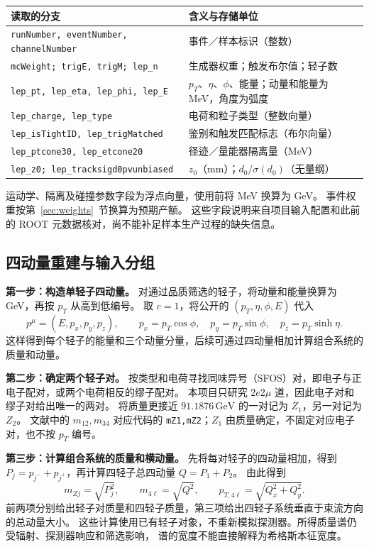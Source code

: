 \documentclass[11pt,a4paper,fontset=fandol,scheme=plain]{ctexart}
\newcommand{\gev}{\,\mathrm{GeV}}
\begin{document}
\begingroup
\small
\renewcommand{\arraystretch}{1.13}
\begin{tabularx}{\linewidth}{@{}p{.62\linewidth}Y@{}}
\toprule
读取的分支 & 含义与存储单位 \\
\midrule
\texttt{runNumber, eventNumber, channelNumber} & 事件／样本标识（整数） \\
\texttt{mcWeight; trigE, trigM; lep\_n} & 生成器权重；触发布尔值；轻子数 \\
\texttt{lep\_pt, lep\_eta, lep\_phi, lep\_E} & $p_T$、$\eta$、$\phi$、能量；动量和能量为 MeV，角度为弧度 \\
\texttt{lep\_charge, lep\_type} & 电荷和粒子类型（整数向量） \\
\texttt{lep\_isTightID, lep\_trigMatched} & 鉴别和触发匹配标志（布尔向量） \\
\texttt{lep\_ptcone30, lep\_etcone20} & 径迹／量能器隔离量（MeV） \\
\texttt{lep\_z0; lep\_tracksigd0pvunbiased} & $z_0$（mm）；$d_0/\sigma(d_0)$（无量纲） \\
\bottomrule
\end{tabularx}
\endgroup

运动学、隔离及碰撞参数字段为浮点向量，使用前将 MeV 换算为 GeV。
事件权重按第~\ref{sec:weights}~节换算为预期产额。
这些字段说明来自项目输入配置和此前的 ROOT 元数据核对，尚不能补足样本生产过程的缺失信息。
\subsection{四动量重建与输入分组}
\textbf{第一步：构造单轻子四动量。} 对通过品质筛选的轻子，将动量和能量换算为 GeV，再按 $p_T$ 从高到低编号。
取 $c=1$，将公开的 $(p_T,\eta,\phi,E)$ 代入
\[
 p^\mu=(E,p_x,p_y,p_z),\qquad
 p_x=p_T\cos\phi,\quad p_y=p_T\sin\phi,\quad p_z=p_T\sinh\eta.
\]
这样得到每个轻子的能量和三个动量分量，后续可通过四动量相加计算组合系统的质量和动量。

\textbf{第二步：确定两个轻子对。} 按类型和电荷寻找同味异号（SFOS）对，即电子与正电子配对，或两个电荷相反的缪子配对。
本项目只研究 $2e2\mu$ 道，因此电子对和缪子对给出唯一的两对。
将质量更接近 $91.1876\gev$ 的一对记为 $Z_1$，另一对记为 $Z_2$。
文献中的 $m_{12},m_{34}$ 对应代码的 \texttt{mZ1,mZ2}；$Z_1$ 由质量确定，不固定对应电子对，也不按 $p_T$ 编号。

\textbf{第三步：计算组合系统的质量和横动量。}
先将每对轻子的四动量相加，得到 $P_j=p_{j^-}+p_{j^+}$，再计算四轻子总四动量 $Q=P_1+P_2$。
由此得到
\[
 m_{Zj}=\sqrt{P_j^2},\qquad m_{4\ell}=\sqrt{Q^2},\qquad
 p_{T,4\ell}=\sqrt{Q_x^2+Q_y^2}.
\]
前两项分别给出轻子对质量和四轻子质量，第三项给出四轻子系统垂直于束流方向的总动量大小。
这些计算使用已有轻子对象，不重新模拟探测器。所得质量谱仍受辐射、探测器响应和筛选影响，
谱的宽度不能直接解释为希格斯本征宽度。
\end{document}
